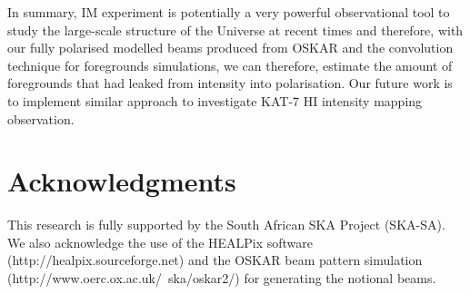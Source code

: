 \documentclass[fleqn,usenatbib]{mnras}
\begin{document}
In summary, IM experiment is potentially a very powerful observational tool to study the large-scale structure of the Universe at recent times and therefore, with our fully polarised modelled beams produced from OSKAR and the convolution technique for foregrounds simulations, we can therefore, estimate the amount of foregrounds that had leaked from intensity into polarisation. Our future work is to implement similar approach to investigate KAT-7 HI intensity mapping observation.
%
%

\section*{Acknowledgments}
This research is fully supported by the South African SKA Project (SKA-SA). We also acknowledge the use of the HEALPix software (http://healpix.sourceforge.net) and the OSKAR beam pattern simulation (http://www.oerc.ox.ac.uk/~ska/oskar2/) for generating the notional beams.





%
\nocite{*}


\newpage
\appendix
\end{document}
